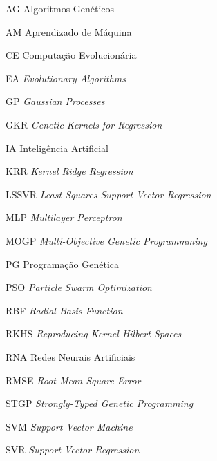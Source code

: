 \begin{siglas}
  \item[AG] Algoritmos Genéticos
  \item[AM] Aprendizado de Máquina
  \item[CE] Computação Evolucionária
  \item[EA] \textit{Evolutionary Algorithms}
  \item[GP] \textit{Gaussian Processes}
  \item[GKR] \textit{Genetic Kernels for Regression}
  \item[IA] Inteligência Artificial
  \item[KRR] \textit{Kernel Ridge Regression}
  \item[LSSVR] \textit{Least Squares Support Vector Regression}
  \item[MLP] \textit{Multilayer Perceptron}
  \item[MOGP] \textit{Multi-Objective Genetic Programmming}
  \item[PG] Programação Genética
  \item[PSO] \textit{Particle Swarm Optimization}
  \item[RBF] \textit{Radial Basis Function}
  \item[RKHS] \textit{Reproducing Kernel Hilbert Spaces}
  \item[RNA] Redes Neurais Artificiais
  \item[RMSE] \textit{Root Mean Square Error}
  \item[STGP] \textit{Strongly-Typed Genetic Programming}
  \item[SVM] \textit{Support Vector Machine}
  \item[SVR] \textit{Support Vector Regression}
\end{siglas}